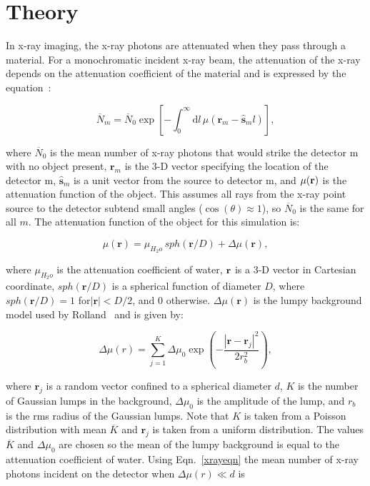 \section{Theory}
In x-ray imaging, the x-ray photons are attenuated when they pass through a material.  For a monochromatic incident x-ray beam, the attenuation of the x-ray depends on the attenuation coefficient of the material and is expressed by the equation~\citep{Barrett2004}:

\begin{equation}
\label{xrayeqn}
\overline{N}_m = \overline{N}_0 \exp\left[-\int_0^{\infty} \! \mathrm{d}l \,\mu(\mathbf{r}_{m}-\hat{\mathbf{s}}_m l )\right],
\end{equation}

\noindent where $\overline{N}_0$ is the mean number of x-ray photons that would strike the detector m with no object present, $\mathbf{r}_m$ is the 3-D vector specifying the location of the detector m, $\mathbf{\hat{s}}_m$ is a unit vector from the source to detector m, and $\mu(\bf{r})$ is the attenuation function of the object.  This assumes all rays from the x-ray point source to the detector subtend small angles ($\cos(\theta)\approx 1$), so $\overline{N}_0$ is the same for all $m$.  The attenuation function of the object for this simulation is:

\begin{equation}
\label{obj_eqn}
\mu({\mathbf{r}}) = \mu_{H_2o} \, sph(\mathbf{r}/D) + \Delta\mu({\mathbf{r}}), 
\end{equation}

\noindent
where $\mu_{H_2o}$ is the attenuation coefficient of water, $\bf{r}$ is a 3-D vector in Cartesian coordinate, $sph(\textbf{r}/D)$ is a spherical function of diameter $D$, where $sph(\textbf{r}/D)=1$ for$|\textbf{r}|<D/2$, and $0$ otherwise.  $\Delta \mu(\textbf{r})$ is the lumpy background model used by Rolland~\citep{Rolland1992} and is given by:

\begin{equation}
\label{lumpy}
\Delta\mu(r) = \sum\limits_{j = 1}^{K}\Delta\mu_0 \exp\left(-\frac{|\mathbf{r}-\mathbf{r}_j|^2}{2r_b^2}   \right),
\end{equation}

\noindent
where $\mathbf{r}_j$ is a random vector confined to a spherical diameter $d$, $K$ is the number of Gaussian lumps in the background, $\Delta\mu_0$ is the amplitude of the lump, and $r_b$ is the rms radius of the Gaussian lumps.  Note that $K$ is taken from a Poisson distribution with mean $\overline{K}$ and $\mathbf{r}_j$ is taken from a uniform distribution.  The values $\overline{K}$ and $\Delta\mu_0$ are chosen so the mean of the lumpy background is equal to the attenuation coefficient of water.
\noindent
Using Eqn.~\ref{xrayeqn} the mean number of x-ray photons incident on the detector when $\Delta\mu(r) \ll d$ is

